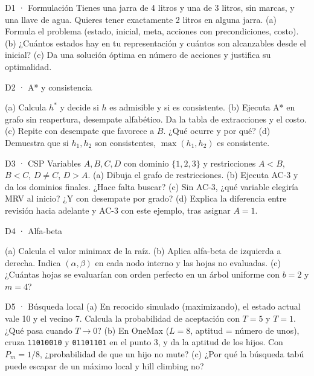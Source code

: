 \begin{ejercicio}{D1 · Formulación }
Tienes una jarra de 4 litros y una de 3 litros, sin marcas, y una llave de agua. Quieres tener
exactamente 2 litros en alguna jarra.
(a) Formula el problema (estado, inicial, meta, acciones con precondiciones, costo). 
(b) ¿Cuántos estados hay en tu representación y cuántos son alcanzables desde el inicial? 
(c) Da una solución óptima en número de acciones y justifica su optimalidad. 
\end{ejercicio}

\begin{ejercicio}{D2 · A* y consistencia }
\begin{center}\figGTres\end{center}
(a) Calcula $h^*$ y decide si $h$ es admisible y si es consistente. 
(b) Ejecuta A* en grafo sin reapertura, desempate alfabético. Da la tabla de extracciones y el costo. 
(c) Repite con desempate que favorece a $B$. ¿Qué ocurre y por qué? 
(d) Demuestra que si $h_1,h_2$ son consistentes, $\max(h_1,h_2)$ es consistente. 
\end{ejercicio}

\begin{ejercicio}{D3 · CSP }
Variables $A,B,C,D$ con dominio $\{1,2,3\}$ y restricciones $A<B$, $B<C$, $D\ne C$, $D>A$.
(a) Dibuja el grafo de restricciones. 
(b) Ejecuta AC-3 y da los dominios finales. ¿Hace falta buscar? 
(c) Sin AC-3, ¿qué variable elegiría MRV al inicio? ¿Y con desempate por grado? 
(d) Explica la diferencia entre revisión hacia adelante y AC-3 con este ejemplo, tras asignar $A=1$. 
\end{ejercicio}

\begin{ejercicio}{D4 · Alfa-beta }
\begin{center}\figTTres\end{center}
(a) Calcula el valor minimax de la raíz. 
(b) Aplica alfa-beta de izquierda a derecha. Indica $(\alpha,\beta)$ en cada nodo interno y las hojas no evaluadas. 
(c) ¿Cuántas hojas se evaluarían con orden perfecto en un árbol uniforme con $b=2$ y $m=4$? 
\end{ejercicio}

\begin{ejercicio}{D5 · Búsqueda local }
(a) En recocido simulado (maximizando), el estado actual vale 10 y el vecino 7. Calcula la probabilidad
de aceptación con $T=5$ y $T=1$. ¿Qué pasa cuando $T\to 0$? 
(b) En OneMax ($L=8$, aptitud = número de unos), cruza \texttt{11010010} y \texttt{01101101} en el punto
3, y da la aptitud de los hijos. Con $P_m=1/8$, ¿probabilidad de que un hijo no mute? 
(c) ¿Por qué la búsqueda tabú puede escapar de un máximo local y hill climbing no? 
\end{ejercicio}

